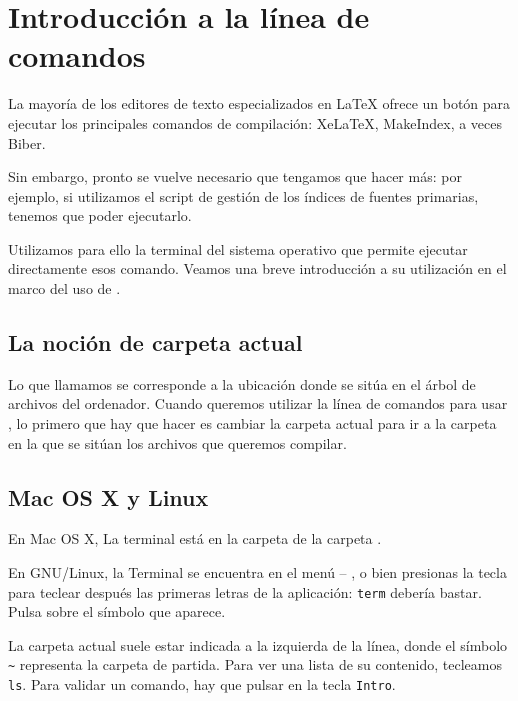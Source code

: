 \chapter{Introducción a la línea de comandos}\label{terminal}

\begin{intro}
La mayoría de los editores de texto especializados en LaTeX ofrece un botón para ejecutar los principales comandos de compilación:  XeLaTeX, MakeIndex, a veces Biber.

Sin embargo, pronto se vuelve necesario que tengamos que hacer más: por ejemplo, si utilizamos el script de gestión de los índices de fuentes primarias, tenemos que poder ejecutarlo.

Utilizamos para ello la terminal del sistema operativo que permite ejecutar directamente esos comando. Veamos una breve introducción a su utilización en el marco del uso de \XeLaTeX.
\end{intro}

\section{La noción de carpeta actual}\label{repcourant}

Lo que llamamos  se corresponde a la ubicación donde se sitúa en el árbol de archivos del ordenador. Cuando queremos utilizar la línea de comandos para usar \XeLaTeX, lo primero que hay que hacer es cambiar la carpeta actual para ir a la carpeta en la que se sitúan los archivos que queremos compilar.

\section{Mac OS X y Linux}

En Mac OS X, La terminal está en la carpeta  de la carpeta . 

En GNU/Linux, la Terminal se encuentra en el menú  – 
, o bien presionas la tecla  para teclear después las primeras letras de la aplicación: \verb|term| debería bastar. Pulsa sobre el símbolo que aparece.

La carpeta actual suele estar indicada a la izquierda de la línea, donde el símbolo  \verb|~|  representa la carpeta de partida. Para ver una lista de su contenido, tecleamos \verb|ls|. Para validar un comando, hay que pulsar en la tecla \verb|Intro|.

